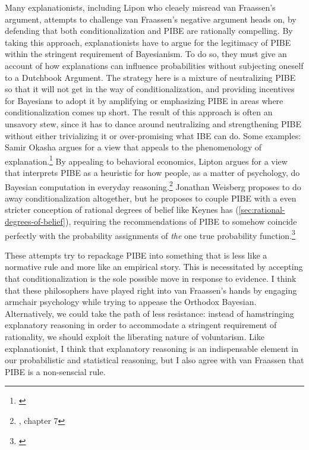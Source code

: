 Many explanationists, including Lipon who cleaely misread van Fraassen's argument, attempts to challenge van Fraassen's negative argument heads
on, by defending that both conditionalization and PIBE are rationally
compelling. By taking this approach, explanationists have to argue for
the legitimacy of PIBE within the stringent requirement of Bayesianism.
To do so, they must give an account of how explanations can influence
probabilities without subjecting oneself to a Dutchbook Argument. The
strategy here is a mixture of neutralizing PIBE so that it will not get
in the way of conditionalization, and providing incentives for Bayesians
to adopt it by amplifying or emphasizing PIBE in areas where
conditionalization comes up short. The result of this approach is often
an unsavory stew, since it has to dance around neutralizing and
strengthening PIBE without either trivializing it or over-promising what
IBE can do. Some examples: Samir Okasha argues for a view that appeals to the phenomenology of explanation.\footnote{\cite{okasha}} By appealing to behavioral economics, Lipton argues for a view that interprets PIBE as a heuristic for how people, as a matter of psychology, do Bayesian computation in everyday reasoning.\footnote{\cite{lipton}, chapter 7} Jonathan Weisberg proposes to do away conditionalization altogether, but he proposes to couple PIBE with a even stricter conception of rational degrees of belief like Keynes has (\ref{sec:rational-degrees-of-belief}), requiring the recommendations of PIBE to somehow coincide perfectly with the probability assignments of \emph{the} one true probability function.\footnote{\cite{locatingibe}}

These attempts try to repackage PIBE into something that is less like a normative rule and more like an empirical story. This is necessitated by accepting that conditionalization is the sole possible move in response to evidence. I think that these philosophers have played right into van Fraassen's hands by engaging armchair psychology while trying to appease the Orthodox Bayesian. Alternatively, we could take the path of less resistance: instead of
hamstringing explanatory reasoning in order to accommodate a stringent
requirement of rationality, we should exploit the liberating
nature of voluntarism. Like explanationist, I think that explanatory
reasoning is an indispensable element in our probabilistic and
statistical reasoning, but I also agree with van Fraassen that PIBE is a non-senscial rule. 


